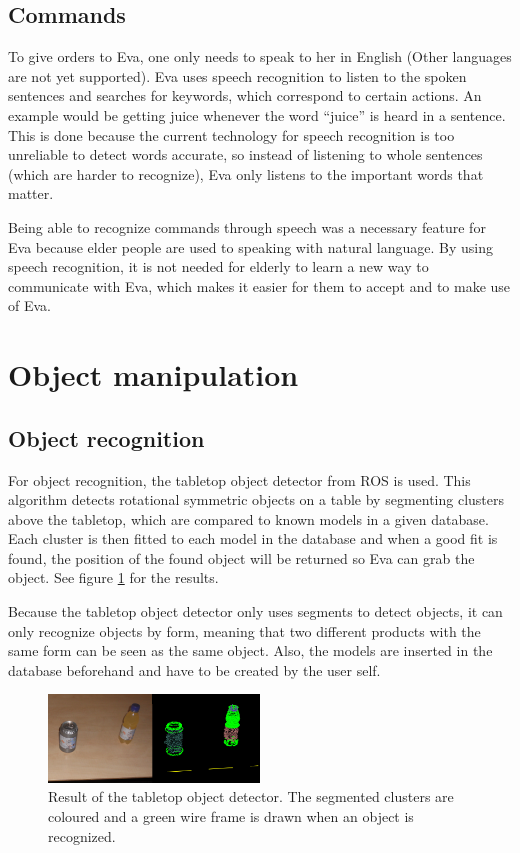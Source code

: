 \documentclass[project_eva.tex]{subfiles}
\begin{document}
\subsection*{Commands}
To give orders to Eva, one only needs to speak to her in English (Other languages are not yet supported). Eva uses speech 
recognition to listen to the spoken sentences and searches for keywords, which correspond to certain actions. An example 
would be getting juice whenever the word ``juice'' is heard in a sentence. This is done because the current technology for 
speech recognition is too unreliable to detect words accurate, so instead of listening to whole sentences (which are harder 
to recognize), Eva only listens to the important words that matter.

Being able to recognize commands through speech was a necessary feature for Eva because elder people are used to speaking 
with natural language. By using speech recognition, it is not needed for elderly to learn a new way to communicate with 
Eva, which makes it easier for them to accept and to make use of Eva.

\section*{Object manipulation}
\subsection*{Object recognition}
For object recognition, the tabletop object detector from ROS is used. This algorithm detects rotational symmetric objects on a table by segmenting clusters above the tabletop, which are compared to known models in a given database. Each cluster is then fitted to each model in the database and when a good fit is found, the position of the found object will be returned so Eva can grab the object. See figure \ref{fig:tabletop} for the results.

Because the tabletop object detector only uses segments to detect objects, it can only recognize objects by form, meaning that two different products with the same form can be seen as the same object. Also, the models are inserted in the database beforehand and have to be created by the user self.

\begin{figure}[h]
	\centering
	\mbox{\includegraphics[width=0.5\textwidth]{Images/object_detector.png}}
	\caption{Result of the tabletop object detector. The segmented clusters are coloured and a green wire frame is drawn when an object is recognized.}
	\label{fig:tabletop}
\end{figure}
\end{document}
